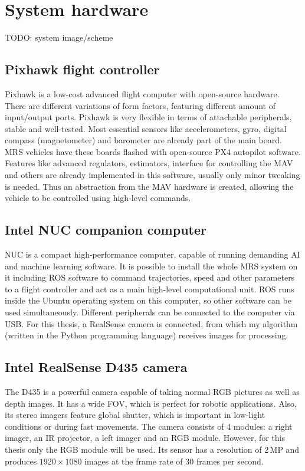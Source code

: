 \section{System hardware}

TODO: system image/scheme

\subsection{Pixhawk flight controller}

Pixhawk is a low-cost advanced flight computer with open-source hardware. There are different variations of form factors, featuring different amount of input/output ports. Pixhawk is very flexible in terms of attachable peripherals, stable and well-tested. Most essential sensors like accelerometers, gyro, digital compass (magnetometer) and barometer are already part of the main board. \acs{MRS} vehicles have these boards flashed with open-source PX4 autopilot software. Features like advanced regulators, estimators, interface for controlling the \acs{MAV} and others are already implemented in this software, usually only minor tweaking is needed. Thus an abstraction from the \acs{MAV} hardware is created, allowing the vehicle to be controlled using high-level commands.


\subsection{Intel NUC companion computer}

NUC is a compact high-performance computer, capable of running demanding AI and machine learning software. It is possible to install the whole \acs{MRS} system on it including \acs{ROS} software to command trajectories, speed and other parameters to a flight controller and act as a main high-level computational unit. \acs{ROS} runs inside the Ubuntu operating system on this computer, so other software can be used simultaneously. Different peripherals can be connected to the computer via \acs{USB}. For this thesis, a RealSense camera is connected, from which my algorithm (written in the Python programming language) receives images for processing.

\subsection{Intel RealSense D435 camera}

The D435 is a powerful camera capable of taking normal \acs{RGB} pictures as well as depth images. It has a wide \acs{FOV}, which is perfect for robotic applications. Also, its stereo imagers feature global shutter, which is important in low-light conditions or during fast movements. The camera consists of 4 modules: a right imager, an \acs{IR} projector, a left imager and an \acs{RGB} module. However, for this thesis only the \acs{RGB} module will be used. Its sensor has a resolution of 2\,MP and produces $1920\times1080$ images at the frame rate of 30 frames per second.


